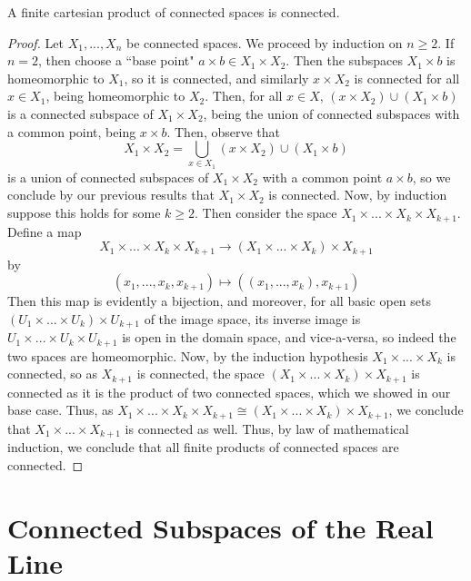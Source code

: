 \documentclass[12pt, a4paper, oneside, openright, titlepage]{book}
\begin{document}
\begin{theorem}
    A finite cartesian product of connected spaces is connected.
\end{theorem}
\begin{proof}
    Let $X_1,...,X_n$ be connected spaces. We proceed by induction on $n \geq 2$. If $n = 2$, then choose a ``base point" $a\times b \in X_1\times X_2$. Then the subspaces $X_1 \times b$ is homeomorphic to $X_1$, so it is connected, and similarly $x \times X_2$ is connected for all $x \in X_1$, being homeomorphic to $X_2$. Then, for all $x \in X$, $(x\times X_2)\cup (X_1 \times b)$ is a connected subspace of $X_1\times X_2$, being the union of connected subspaces with a common point, being $x\times b$. Then, observe that \begin{equation*}
        X_1 \times X_2 = \bigcup\limits_{x \in X_1}(x\times X_2)\cup(X_1\times b)
    \end{equation*}
    is a union of connected subspaces of $X_1\times X_2$ with a common point $a \times b$, so we conclude by our previous results that $X_1 \times X_2$ is connected. Now, by induction suppose this holds for some $k \geq 2$. Then consider the space $X_1 \times ... \times X_k \times X_{k+1}$. Define a map \begin{equation*}
        X_1\times ... \times X_k\times X_{k+1}\rightarrow (X_1\times ... \times X_k)\times X_{k+1}
    \end{equation*}
    by \begin{equation*}
        (x_1,...,x_k,x_{k+1}) \mapsto ((x_1,...,x_k), x_{k+1})
    \end{equation*}
    Then this map is evidently a bijection, and moreover, for all basic open sets $(U_1\times ... \times U_k)\times U_{k+1}$ of the image space, its inverse image is $U_1 \times ... \times U_k \times U_{k+1}$ is open in the domain space, and vice-a-versa, so indeed the two spaces are homeomorphic. Now, by the induction hypothesis $X_1\times ... \times X_k$ is connected, so as $X_{k+1}$ is connected, the space $(X_1\times ... \times X_k)\times X_{k+1}$ is connected as it is the product of two connected spaces, which we showed in our base case. Thus, as $X_1\times ... \times X_k\times X_{k+1} \cong (X_1\times ... \times X_k)\times X_{k+1}$, we conclude that $X_1\times ...\times X_{k+1}$ is connected as well. Thus, by law of mathematical induction, we conclude that all finite products of connected spaces are connected.
\end{proof}


\section{Connected Subspaces of the Real Line}
\end{document}
